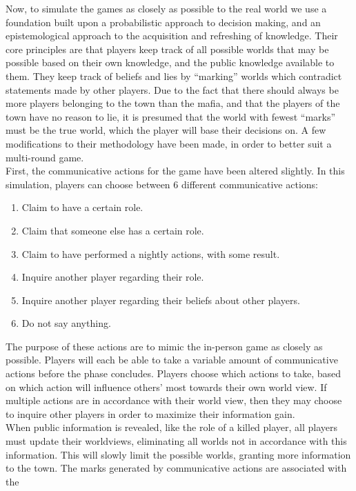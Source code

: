 Now, to simulate the games as closely as possible to the real world we use a 
foundation built upon a probabilistic approach to decision making, and an 
epistemological approach to the acquisition and refreshing of 
knowledge\cite{commitment}. 
Their core principles are that players keep track of all possible worlds that
may be possible based on their own knowledge, and the public knowledge
available to them. They keep track of beliefs and lies by “marking” worlds
which contradict statements made by other players. Due to the fact that there
should always be more players belonging to the town than the mafia, and that
the players of the town have no reason to lie, it is presumed that the world
with fewest “marks” must be the true world, which the player will base their
decisions on. A few modifications to their methodology have been made, in order
to better suit a multi-round game. \\
First, the communicative actions for the
game have been altered slightly. In this simulation, players can choose between
6 different communicative actions:
\begin{enumerate}
    \item Claim to have a certain role.
    \item Claim that someone else has a certain role.
    \item Claim to have performed a nightly actions, with some result.
    \item Inquire another player regarding their role.
    \item Inquire another player regarding their beliefs about other players.
    \item Do not say anything.
\end{enumerate}
The purpose of these actions are to mimic the in-person game as closely as
possible. Players will each be able to take a variable amount of communicative actions before the
phase concludes. Players choose which actions to take, based on which action
will influence others’ most towards their own world view. If multiple actions
are in accordance with their world view, then they may choose to inquire other
players in order to maximize their information gain. \\
When public information is
revealed, like the role of a killed player, all players must update their
worldviews, eliminating all worlds not in accordance with this information.
This will slowly limit the possible worlds, granting more information to the
town. The marks generated by communicative actions are associated with the
